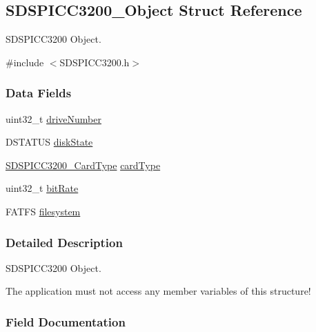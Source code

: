 \subsection{S\-D\-S\-P\-I\-C\-C3200\-\_\-\-Object Struct Reference}
\label{struct_s_d_s_p_i_c_c3200___object}


S\-D\-S\-P\-I\-C\-C3200 Object.  




{\ttfamily \#include $<$S\-D\-S\-P\-I\-C\-C3200.\-h$>$}

\subsubsection*{Data Fields}
\begin{DoxyCompactItemize}
\item 
uint32\-\_\-t \hyperlink{struct_s_d_s_p_i_c_c3200___object_a79ac1ce3451b5ef57859a289ae9fec22}{drive\-Number}
\item 
D\-S\-T\-A\-T\-U\-S \hyperlink{struct_s_d_s_p_i_c_c3200___object_ab2616f0419bf15e11e2e066d2af1de49}{disk\-State}
\item 
\hyperlink{_s_d_s_p_i_c_c3200_8h_aef9c37db8744ba414b93ef56c1473be7}{S\-D\-S\-P\-I\-C\-C3200\-\_\-\-Card\-Type} \hyperlink{struct_s_d_s_p_i_c_c3200___object_a4b78b0482f55e904320e627d88979261}{card\-Type}
\item 
uint32\-\_\-t \hyperlink{struct_s_d_s_p_i_c_c3200___object_a835314275c71a9e04b55e79c01963603}{bit\-Rate}
\item 
F\-A\-T\-F\-S \hyperlink{struct_s_d_s_p_i_c_c3200___object_abe597d34136c1852c3c39971255b2204}{filesystem}
\end{DoxyCompactItemize}


\subsubsection{Detailed Description}
S\-D\-S\-P\-I\-C\-C3200 Object. 

The application must not access any member variables of this structure! 

\subsubsection{Field Documentation}

